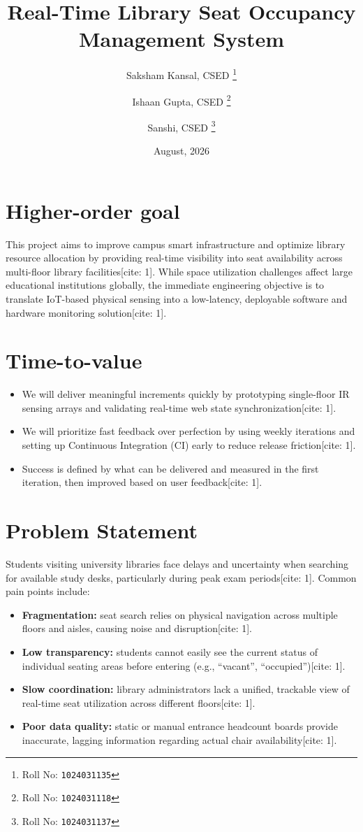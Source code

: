 \documentclass[11pt,a4paper]{article}
\title{Real-Time Library Seat Occupancy Management System}
\author{
  Saksham Kansal, CSED%
  \thanks{Roll No: \texttt{1024031135}}
  \and 
  Ishaan Gupta, CSED%
  \thanks{Roll No: \texttt{1024031118}}
  \and 
  Sanshi, CSED%
  \thanks{Roll No: \texttt{1024031137}}
}
\date{August, 2026}
\begin{document}
\maketitle

\section{Higher-order goal}
This project aims to improve campus smart infrastructure and optimize library resource allocation by providing real-time visibility into seat availability across multi-floor library facilities[cite: 1]. While space utilization challenges affect large educational institutions globally, the immediate engineering objective is to translate IoT-based physical sensing into a low-latency, deployable software and hardware monitoring solution[cite: 1].

\section{Time-to-value}
\begin{itemize}[leftmargin=0.7cm]
    \item We will deliver meaningful increments quickly by prototyping single-floor IR sensing arrays and validating real-time web state synchronization[cite: 1].
    \item We will prioritize fast feedback over perfection by using weekly iterations and setting up Continuous Integration (CI) early to reduce release friction[cite: 1].
    \item Success is defined by what can be delivered and measured in the first iteration, then improved based on user feedback[cite: 1].
\end{itemize}

\section{Problem Statement}
Students visiting university libraries face delays and uncertainty when searching for available study desks, particularly during peak exam periods[cite: 1]. Common pain points include:
\begin{itemize}[leftmargin=0.7cm]
    \item \textbf{Fragmentation:} seat search relies on physical navigation across multiple floors and aisles, causing noise and disruption[cite: 1].
    \item \textbf{Low transparency:} students cannot easily see the current status of individual seating areas before entering (e.g., ``vacant'', ``occupied'')[cite: 1].
    \item \textbf{Slow coordination:} library administrators lack a unified, trackable view of real-time seat utilization across different floors[cite: 1].
    \item \textbf{Poor data quality:} static or manual entrance headcount boards provide inaccurate, lagging information regarding actual chair availability[cite: 1].
\end{itemize}
\end{document}
